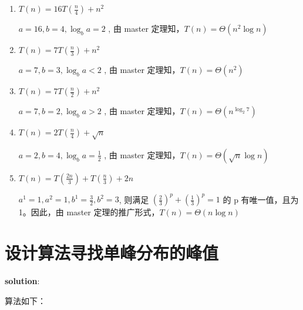 \documentclass[UTF8]{ctexart}
\begin{document}
\begin{enumerate}
    \item $ T\left( n \right)  = 16 T\left( \frac{n}{4} \right) + n^{2} $  

        $ a = 16, b = 4, \log_b a = 2 $ , 由 master 定理知，$ T\left( n \right) = \Theta\left( n^{2}\log n \right)  $ 

    \item $ T\left( n \right) = 7 T\left( \frac{n}{3} \right) + n^{2} $ 

        $ a = 7, b = 3, \log_b a < 2 $ , 由 master 定理知，$ T\left( n \right) = \Theta\left( n^{2} \right)  $ 

    \item $ T\left(n  \right)  = 7 T\left( \frac{n}{2} \right) + n^{2}$ 

        $ a = 7, b = 2, \log_b a > 2 $ , 由 master 定理知，$ T\left( n \right) = \Theta\left( n^{\log_2 7} \right)  $ 

    \item $ T\left( n \right) = 2 T\left( \frac{n}{4} \right) + \sqrt{n}   $ 

        $ a = 2, b = 4, \log_b a = \frac{1}{2} $ , 由 master 定理知，$ T\left( n \right) = \Theta\left( \sqrt{n} \log n  \right)  $ 

    \item $ T\left( n \right) = T\left( \frac{2n}{3}\right) + T\left( \frac{n}{3} \right) + 2n  $ 

        $ a^{1}=1, a^{2}=1, b^{1}=\frac{3}{2}, b^{2} = 3 $, 则满足 $(\frac{2}{3})^{p} + (\frac{1}{3})^{p} =1  $ 的 p 有唯一值，且为 1。因此，由 master 定理的推广形式，$ T\left( n \right) = \Theta\left( n \log n \right)  $ 



\end{enumerate}


\section{设计算法寻找单峰分布的峰值}%
\label{sec:设计算法寻找单峰分布的峰值}


\textbf{solution}:

    算法如下：

\renewcommand{\algorithmicrequire}{ \textbf{Input:}}
\renewcommand{\algorithmicensure}{ \textbf{Output:}}
\end{document}
